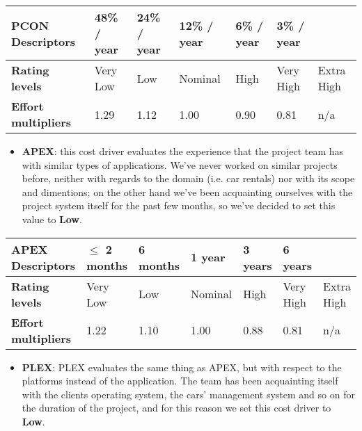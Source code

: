 		\begin{center}
			\begin{tabular}{ | C{2cm} | C{2cm} | C{2cm} | C{2cm} | C{2cm} | C{2cm} | C{2cm} | }
				\hline
				\textbf{PCON Descriptors} & 48\% / year & 24\% / year & 12\% / year & 6\% / year & 3\% / year & \\ \hline
			
				\textbf{Rating levels} & Very Low & Low & Nominal & High & Very High & Extra High\\ \hline
			
				\textbf{Effort multipliers} & 1.29 & 1.12 & 1.00 & 0.90 & 0.81 & n/a\\ \hline
			\end{tabular}
		\end{center}
		
		
		
		
		\begin{itemize}
			\item \textbf{APEX}: this cost driver evaluates the experience that the project team has with similar types of applications. We've never worked on similar projects before, neither with regards to the domain (i.e. car rentals) nor with its scope and dimentions; on the other hand we've been acquainting ourselves with the project system itself for the past few months, so we've decided to set this value to \textbf{Low}.
		\end{itemize}
		
		\begin{center}
			\begin{tabular}{ | C{2cm} | C{2cm} | C{2cm} | C{2cm} | C{2cm} | C{2cm} | C{2cm} | }
				\hline
				\textbf{APEX Descriptors} & $\leq$ 2 months & 6 months & 1 year & 3 years & 6 years & \\ \hline
			
				\textbf{Rating levels} & Very Low & Low & Nominal & High & Very High & Extra High\\ \hline
			
				\textbf{Effort multipliers} & 1.22 & 1.10 & 1.00 & 0.88 & 0.81 & n/a\\ \hline
			\end{tabular}
		\end{center}
		
		
		
		
		\begin{itemize}
			\item \textbf{PLEX}: PLEX evaluates the same thing as APEX, but with respect to the platforms instead of the application. The team has been acquainting itself with the clients operating system, the cars' management system and so on for the duration of the project, and for this reason we set this cost driver to \textbf{Low}.
		\end{itemize}
		
